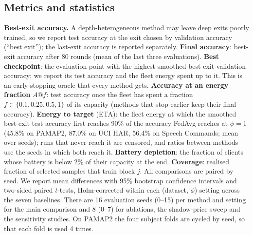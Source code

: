 \subsection{Metrics and statistics}
\textbf{Best-exit accuracy.} A depth-heterogeneous method may leave deep exits poorly trained, so we report test accuracy at the exit chosen by validation accuracy (``best exit''); the last-exit accuracy is reported separately. \textbf{Final accuracy}: best-exit accuracy after 80 rounds (mean of the last three evaluations). \textbf{Best checkpoint}: the evaluation point with the highest smoothed best-exit validation accuracy; we report its test accuracy and the fleet energy spent up to it. This is an early-stopping oracle that every method gets. \textbf{Accuracy at an energy fraction} $A@f$: test accuracy once the fleet has spent a fraction $f\in\{0.1,0.25,0.5,1\}$ of its capacity (methods that stop earlier keep their final accuracy). \textbf{Energy to target} (ETA): the fleet energy at which the smoothed best-exit test accuracy first reaches 90\% of the accuracy FedAvg reaches at $\phi=1$ (45.8\% on PAMAP2, 87.0\% on UCI HAR, 56.4\% on Speech Commands; mean over seeds); runs that never reach it are censored, and ratios between methods use the seeds in which both reach it. \textbf{Battery depletion}: the fraction of clients whose battery is below 2\% of their capacity at the end. \textbf{Coverage}: realised fraction of selected samples that train block $j$. All comparisons are paired by seed. We report mean differences with 95\% bootstrap confidence intervals and two-sided paired $t$-tests, Holm-corrected within each (dataset, $\phi$) setting across the seven baselines. There are 16 evaluation seeds (0--15) per method and setting for the main comparison and 8 (0--7) for ablations, the shadow-price sweep and the sensitivity studies. On PAMAP2 the four subject folds are cycled by seed, so that each fold is used 4 times.

